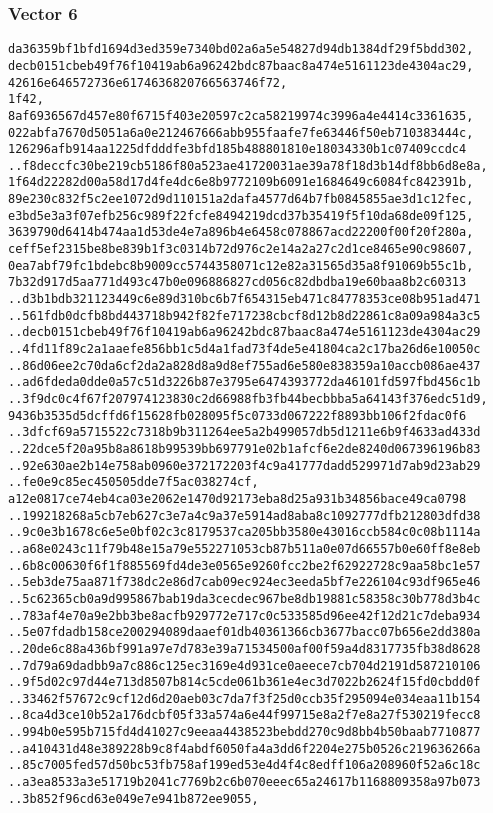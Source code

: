 \documentclass[
]{article}
\begin{document}
\hypertarget{vector-6-2}{%
\subsubsection{Vector 6}\label{vector-6-2}}

\begin{verbatim}
da36359bf1bfd1694d3ed359e7340bd02a6a5e54827d94db1384df29f5bdd302,
decb0151cbeb49f76f10419ab6a96242bdc87baac8a474e5161123de4304ac29,
42616e646572736e6174636820766563746f72,
1f42,
8af6936567d457e80f6715f403e20597c2ca58219974c3996a4e4414c3361635,
022abfa7670d5051a6a0e212467666abb955faafe7fe63446f50eb710383444c,
126296afb914aa1225dfdddfe3bfd185b488801810e18034330b1c07409ccdc4
..f8deccfc30be219cb5186f80a523ae41720031ae39a78f18d3b14df8bb6d8e8a,
1f64d22282d00a58d17d4fe4dc6e8b9772109b6091e1684649c6084fc842391b,
89e230c832f5c2ee1072d9d110151a2dafa4577d64b7fb0845855ae3d1c12fec,
e3bd5e3a3f07efb256c989f22fcfe8494219dcd37b35419f5f10da68de09f125,
3639790d6414b474aa1d53de4e7a896b4e6458c078867acd22200f00f20f280a,
ceff5ef2315be8be839b1f3c0314b72d976c2e14a2a27c2d1ce8465e90c98607,
0ea7abf79fc1bdebc8b9009cc5744358071c12e82a31565d35a8f91069b55c1b,
7b32d917d5aa771d493c47b0e096886827cd056c82dbdba19e60baa8b2c60313
..d3b1bdb321123449c6e89d310bc6b7f654315eb471c84778353ce08b951ad471
..561fdb0dcfb8bd443718b942f82fe717238cbcf8d12b8d22861c8a09a984a3c5
..decb0151cbeb49f76f10419ab6a96242bdc87baac8a474e5161123de4304ac29
..4fd11f89c2a1aaefe856bb1c5d4a1fad73f4de5e41804ca2c17ba26d6e10050c
..86d06ee2c70da6cf2da2a828d8a9d8ef755ad6e580e838359a10accb086ae437
..ad6fdeda0dde0a57c51d3226b87e3795e6474393772da46101fd597fbd456c1b
..3f9dc0c4f67f207974123830c2d66988fb3fb44becbbba5a64143f376edc51d9,
9436b3535d5dcffd6f15628fb028095f5c0733d067222f8893bb106f2fdac0f6
..3dfcf69a5715522c7318b9b311264ee5a2b499057db5d1211e6b9f4633ad433d
..22dce5f20a95b8a8618b99539bb697791e02b1afcf6e2de8240d067396196b83
..92e630ae2b14e758ab0960e372172203f4c9a41777dadd529971d7ab9d23ab29
..fe0e9c85ec450505dde7f5ac038274cf,
a12e0817ce74eb4ca03e2062e1470d92173eba8d25a931b34856bace49ca0798
..199218268a5cb7eb627c3e7a4c9a37e5914ad8aba8c1092777dfb212803dfd38
..9c0e3b1678c6e5e0bf02c3c8179537ca205bb3580e43016ccb584c0c08b1114a
..a68e0243c11f79b48e15a79e552271053cb87b511a0e07d66557b0e60ff8e8eb
..6b8c00630f6f1f885569fd4de3e0565e9260fcc2be2f62922728c9aa58bc1e57
..5eb3de75aa871f738dc2e86d7cab09ec924ec3eeda5bf7e226104c93df965e46
..5c62365cb0a9d995867bab19da3cecdec967be8db19881c58358c30b778d3b4c
..783af4e70a9e2bb3be8acfb929772e717c0c533585d96ee42f12d21c7deba934
..5e07fdadb158ce200294089daaef01db40361366cb3677bacc07b656e2dd380a
..20de6c88a436bf991a97e7d783e39a71534500af00f59a4d8317735fb38d8628
..7d79a69dadbb9a7c886c125ec3169e4d931ce0aeece7cb704d2191d587210106
..9f5d02c97d44e713d8507b814c5cde061b361e4ec3d7022b2624f15fd0cbdd0f
..33462f57672c9cf12d6d20aeb03c7da7f3f25d0ccb35f295094e034eaa11b154
..8ca4d3ce10b52a176dcbf05f33a574a6e44f99715e8a2f7e8a27f530219fecc8
..994b0e595b715fd4d41027c9eeaa4438523bebdd270c9d8bb4b50baab7710877
..a410431d48e389228b9c8f4abdf6050fa4a3dd6f2204e275b0526c219636266a
..85c7005fed57d50bc53fb758af199ed53e4d4f4c8edff106a208960f52a6c18c
..a3ea8533a3e51719b2041c7769b2c6b070eeec65a24617b1168809358a97b073
..3b852f96cd63e049e7e941b872ee9055,
\end{verbatim}
\end{document}
